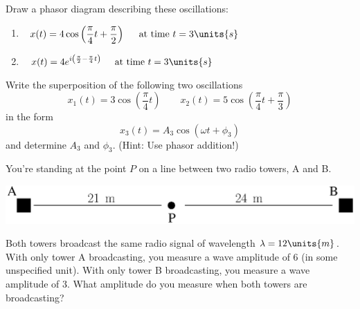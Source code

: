 \begin{problem}
Draw a phasor diagram describing these oscillations:
\begin{enumerate}
\item $\displaystyle\hspace{0.1in}x(t) = 4 \cos\left(\frac{\pi}{4}t 
+ \frac{\pi}{2}\right) \hspace{0.2in} \mbox{at time $t=3\units{s}$}$
\vspace{0.1in}

\item $\displaystyle\hspace{0.1in}x(t) = 4 e^{i\left(\frac{\pi}{2} 
- \frac{\pi}{4}t\right)} \hspace{0.2in} \mbox{at time $t=3\units{s}$}$
\end{enumerate}
\end{problem}

\begin{problem}
Write the superposition of the following two oscillations
\[ 
x_1(t) = 3\cos\left(\frac{\pi}{4}t\right)\quad\quad
 x_2(t) = 5\cos\left(\frac{\pi}{4}t + \frac{\pi}{3}\right) 
\]
in the form
\[ 
x_3(t) = A_3 \cos\left(\omega t + \phi_3\right) 
\]
and determine $A_3$ and $\phi_3$.  (Hint: Use phasor addition!)
\end{problem}

\newpage

\begin{problem}
You're standing at the point $P$ on a line between two radio towers, 
A and B. 

 \includegraphics[width=4.0truein]{phasors/phasor26} 

\noindent Both towers broadcast the same radio signal of wavelength $\lambda =
12\units{m}$. With only tower A broadcasting, you measure a wave amplitude
of 6 (in some unspecified unit).  With only tower B broadcasting, you
measure a wave amplitude of 3. What amplitude do you measure when both
towers are broadcasting?
\label{prob:between_towers}
\end{problem}


